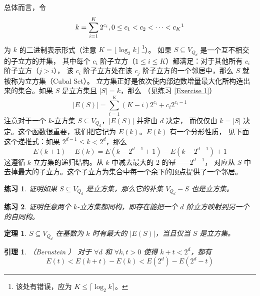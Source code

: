 \documentclass[12pt, a4paper]{article}
\newtheorem{theorem}{定理}
\newtheorem{lemma}{引理}
\newtheorem{exercise}{练习}
\begin{document}
总体而言，令
\begin{equation*}
k = \sum_{i = 1}^K 2^{c_i}, 0 \le c_1 < c_2 < \cdots < c_K \footnotemark
\end{equation*}
为 $k$ 的二进制表示形式（注意 $K = \lfloor \log_2 k \rfloor$
\footnote{该处有错误，应为 $K \le \lceil \log_2 k \rceil$。}）。
如果 $S \subseteq V_{Q_d}$ 是一个互不相交的子立方的并集，
其中每个 $c_i$ 阶子立方（$1 \le i \le K$）都满足：对于其他所有 $c_i$ 阶子立方（$j > i$），
该 $c_i$ 阶子立方处在该 $c_j$ 阶子立方的一个邻居中，那么 $S$ 就被称为立方集（Cubal Set）。
立方集正好是依次使内部边数增量最大化所构造出来的集合。如果 $S$ 是立方集且 $|S| = k$，那么
（见练习 \ref{Exercise 1}）
\begin{equation*}
|E(S)| = \sum_{i = 1}^K (K - i) 2^{c_i} + c_i 2^{c_i - 1}
\end{equation*}
注意对于一个 $k$-立方集 $S \subseteq V_{Q_d}$，$|E(S)|$ 并非由 $d$ 决定，
而仅仅由 $k = |S|$ 决定。这个函数很重要，我们把它记为 $E(k)$。$E(k)$ 有一个分形性质，
见下面这个递推式：如果 $2^{d - 1} \le k < 2^d$，那么
\begin{equation*}
E(k + 1) − E(k) = E(k − 2^{d − 1} + 1) − E(k − 2^{d − 1}) + 1
\end{equation*}
这遵循 $k$-立方集的递归结构。从 $k$ 中减去最大的 $2$ 的幂——$2^{d − 1}$，
对应从 $S$ 中去掉最大的子立方。这个子立方为集合中每一个余下的顶点提供了一个邻居。

\begin{exercise}
\label{Exercise 8}
证明如果 $S \subseteq V_{Q_d}$ 是立方集，那么它的补集 $V_{Q_d} − S$ 也是立方集。
\end{exercise}

\begin{exercise}
\label{Exercise 9}
证明任意两个 $k$-立方集都同构，即存在能把一个 $d$ 阶立方映射到另一个的自同构。
\end{exercise}

\begin{theorem}
\label{Theorem 1}
$S \subseteq V_{Q_d}$ 在基数为 $k$ 时有最大的 $|E(S)|$，当且仅当 $S$ 是立方集。
\end{theorem}

\begin{lemma}
\label{Lemma 3}
（Bernstein \cite{Bernstein.1967}）
对于 $\forall d$ 和 $\forall k, t > 0$ 使得 $k + t < 2^d$，都有
\begin{equation*}
E(t) < E(k + t) − E(k) < E(2^d) − E(2^d − t)
\end{equation*}
\end{lemma}
\end{document}
